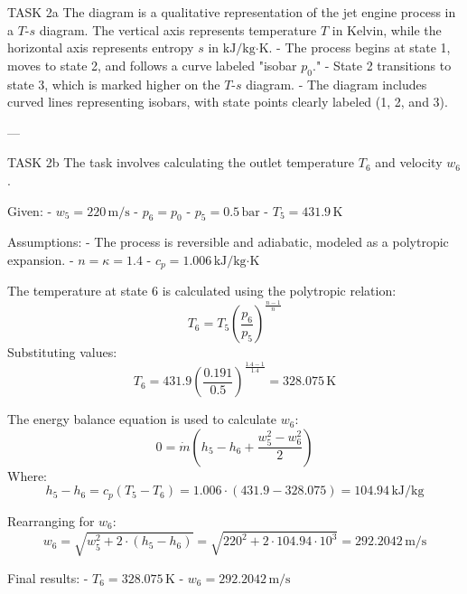 TASK 2a  
The diagram is a qualitative representation of the jet engine process in a \( T \)-\( s \) diagram. The vertical axis represents temperature \( T \) in Kelvin, while the horizontal axis represents entropy \( s \) in \( \text{kJ}/\text{kg·K} \).  
- The process begins at state 1, moves to state 2, and follows a curve labeled "isobar \( p_0 \)."  
- State 2 transitions to state 3, which is marked higher on the \( T \)-\( s \) diagram.  
- The diagram includes curved lines representing isobars, with state points clearly labeled (1, 2, and 3).  

---

TASK 2b  
The task involves calculating the outlet temperature \( T_6 \) and velocity \( w_6 \).  

Given:  
- \( w_5 = 220 \, \text{m/s} \)  
- \( p_6 = p_0 \)  
- \( p_5 = 0.5 \, \text{bar} \)  
- \( T_5 = 431.9 \, \text{K} \)  

Assumptions:  
- The process is reversible and adiabatic, modeled as a polytropic expansion.  
- \( n = \kappa = 1.4 \)  
- \( c_p = 1.006 \, \text{kJ}/\text{kg·K} \)  

The temperature at state 6 is calculated using the polytropic relation:  
\[
T_6 = T_5 \left( \frac{p_6}{p_5} \right)^{\frac{n-1}{n}}
\]  
Substituting values:  
\[
T_6 = 431.9 \left( \frac{0.191}{0.5} \right)^{\frac{1.4-1}{1.4}} = 328.075 \, \text{K}
\]  

The energy balance equation is used to calculate \( w_6 \):  
\[
0 = \dot{m} \left( h_5 - h_6 + \frac{w_5^2 - w_6^2}{2} \right)
\]  
Where:  
\[
h_5 - h_6 = c_p (T_5 - T_6) = 1.006 \cdot (431.9 - 328.075) = 104.94 \, \text{kJ/kg}
\]  

Rearranging for \( w_6 \):  
\[
w_6 = \sqrt{w_5^2 + 2 \cdot (h_5 - h_6)} = \sqrt{220^2 + 2 \cdot 104.94 \cdot 10^3} = 292.2042 \, \text{m/s}
\]  

Final results:  
- \( T_6 = 328.075 \, \text{K} \)  
- \( w_6 = 292.2042 \, \text{m/s} \)  